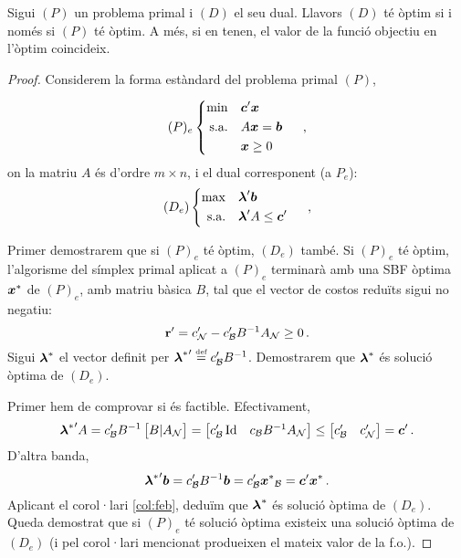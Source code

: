 \begin{teo}\label{teo:dualitat-fort}
    Sigui $\left(P\right)$ un problema primal i $\left(D\right)$ el seu dual. Llavors $(D)$ té òptim si i només si $(P)$ té òptim. A més, si en tenen, el valor de la funció objectiu en l'òptim coincideix.
    \begin{proof}
    	Considerem la forma estàndard del problema primal $(P)$,
    	
    	\[
    		(P)_e
    		\begin{cases}
    		\begin{aligned}
			   	\min 			&&& \boldsymbol{c}'\boldsymbol{x}\\
	    		\text{s.a.}		&&& A\boldsymbol{x} = \boldsymbol{b}\\
	    						&&& \boldsymbol{x}\ge0
    		\end{aligned}
    		\end{cases}\ ,
    	\]
    	on la matriu $A$ és d'ordre $m\times n$, i el dual corresponent (a $P_e$):
    	\[
	    	(D_e)
	    	\begin{cases}
	    	\begin{aligned}
	    	\max 			&&& \boldsymbol{\lambda}'\boldsymbol{b}\\
	    	\text{s.a.}		&&& \boldsymbol{\lambda}'A \le \boldsymbol{c}'
	    	\end{aligned}
	    	\end{cases}\ ,
    	\]
    	
    	Primer demostrarem que si $(P)_e$ té òptim, $(D_e)$ també. Si $(P)_e$ té òptim, l'algorisme del símplex primal aplicat a $(P)_e$ terminarà amb una SBF òptima $\boldsymbol{x}^\ast$ de $(P)_e$, amb matriu bàsica $B$, tal que el vector de costos reduïts sigui no negatiu: \[\mathbf{r}' = c_{\mathcal{N}} '- c_{\mathcal{B}}' B^{-1} A_{\mathcal{N}} \ge 0\,.\] Sigui $\boldsymbol{\lambda}^\ast$ el vector definit per ${\boldsymbol{\lambda}^\ast}'\stackrel{\text{\tiny def}}{=} c_{\mathcal{B}}'B^{-1}$. Demostrarem que $\boldsymbol{\lambda}^\ast$ és solució òptima de $(D_e)$.
    	
    	Primer hem de comprovar si és factible. Efectivament, 
    	\[
    		{\boldsymbol{\lambda}^\ast}'A = 
    		c_{\mathcal{B}}' B^{-1}
    		\begin{bmatrix}
		   		B 	\vert 	A_{\mathcal{N}}
    		\end{bmatrix} =
    		\begin{bmatrix}
    			c_{\mathcal{B}}' \operatorname{Id} & c_{\mathcal{B}} B^{-1} A_{\mathcal{N}}    			
    		\end{bmatrix}
    		\le
    		\begin{bmatrix}
	    		c_{\mathcal{B}}' 	&c_{\mathcal{N}}'
    		\end{bmatrix}
    		= \boldsymbol{c}'\,.
    	\]
    	D'altra banda, \[{\boldsymbol{\lambda}^\ast}'\boldsymbol{b} = c_{\mathcal{B}}' B^{-1} \boldsymbol{b} = c_{\mathcal{B}}' {\boldsymbol{x}^\ast}_{\mathcal{B}} = \boldsymbol{c}'{\boldsymbol{x}^\ast}\,. \] Aplicant el corol·lari \ref{col:feb}, deduïm que $\boldsymbol{\lambda}^\ast$ és solució òptima de $(D_e)$. Queda demostrat que si $(P)_e$ té solució òptima existeix una solució òptima de $(D_e)$ (i pel corol·lari mencionat produeixen el mateix valor de la f.o.).
    	

\end{proof}
\end{teo}

